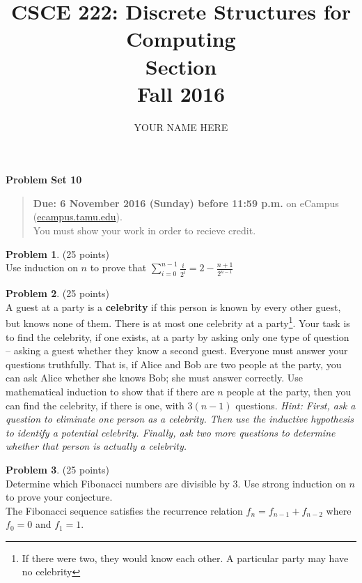 \documentclass{article}
\title{CSCE 222: Discrete Structures for Computing\\Section \mysectionnumber\\Fall 2016}
\author{YOUR NAME HERE}
\theoremstyle{definition}
\newtheorem{problem}{Problem}
\newtheorem*{solution}{Solution}
\newcommand{\problemset}[1]{\begin{center}\textbf{Problem Set #1}\end{center}}
\newcommand{\duedate}[1]{\begin{quote}\textbf{Due: #1} on eCampus (\url{ecampus.tamu.edu}). \\You must show your work in order to recieve credit.\end{quote}}
\begin{document}
\maketitle

\problemset{10}

\duedate{6 November 2016 (Sunday) before 11:59 p.m.}

\bigskip

\begin{problem} (25 points)\\
Use  induction on $n$ to prove that $\displaystyle \sum_{i=0}^{n-1} \frac{i}{2^i} = 2-\frac{n+1}{2^{n-1}}$
\end{problem}



\begin{problem} (25 points)\\
A guest at a party is a \textbf{celebrity} if this person is known by every other guest, but knows none of them. 
There is at most one celebrity at a party\footnote{If there were two, they
would know each other. A particular party may have no celebrity}. 
Your task is to find the celebrity, if one exists, at a party by asking only one type of question --
asking a guest whether they know a second guest.
Everyone must answer your questions truthfully.
That is, if Alice and Bob are two people at the party, you can ask Alice whether she knows Bob; 
she must answer correctly.
Use mathematical induction to show that if there are $n$ people at the party, then you can find the celebrity, if there is one, with $3(n-1)$ questions. 
\textit{Hint: First, ask a question to eliminate one person as a celebrity. 
Then use the inductive hypothesis to identify a potential celebrity.
Finally, ask two more questions to determine whether that person is actually a celebrity.} 
\end{problem}



\begin{problem} (25 points)\\
Determine which Fibonacci numbers are divisible by 3. Use strong induction on $n$ to prove your conjecture.\\
The Fibonacci sequence satisfies the recurrence relation $f_n = f_{n-1} + f_{n-2}$ where $f_0 = 0$ and $f_1 = 1$.
\end{problem}
\end{document}
